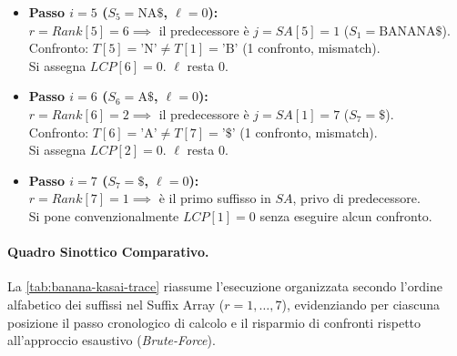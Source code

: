 \begin{itemize}
  \item \textbf{Passo $i = 5$ ($S_5 = \text{NA}\$$, $\ell = 0$):} \\
  $r = Rank[5] = 6 \implies$ il predecessore \`e $j = SA[5] = 1$ ($S_1 = \text{BANANA}\$$). \\
  Confronto: $T[5] = \text{'N'} \neq T[1] = \text{'B'}$ (1 confronto, mismatch). \\
  Si assegna $LCP[6] = 0$. $\ell$ resta $0$.

  \item \textbf{Passo $i = 6$ ($S_6 = \text{A}\$$, $\ell = 0$):} \\
  $r = Rank[6] = 2 \implies$ il predecessore \`e $j = SA[1] = 7$ ($S_7 = \$$). \\
  Confronto: $T[6] = \text{'A'} \neq T[7] = \text{'\$'}$ (1 confronto, mismatch). \\
  Si assegna $LCP[2] = 0$. $\ell$ resta $0$.

  \item \textbf{Passo $i = 7$ ($S_7 = \$$, $\ell = 0$):} \\
  $r = Rank[7] = 1 \implies$ \`e il primo suffisso in $SA$, privo di predecessore. \\
  Si pone convenzionalmente $LCP[1] = 0$ senza eseguire alcun confronto.
\end{itemize}

\paragraph{Quadro Sinottico Comparativo.}
La \autoref{tab:banana-kasai-trace} riassume l'esecuzione organizzata secondo l'ordine alfabetico dei suffissi nel Suffix Array ($r = 1, \dots, 7$), evidenziando per ciascuna posizione il passo cronologico di calcolo e il risparmio di confronti rispetto all'approccio esaustivo (\textit{Brute-Force}).

